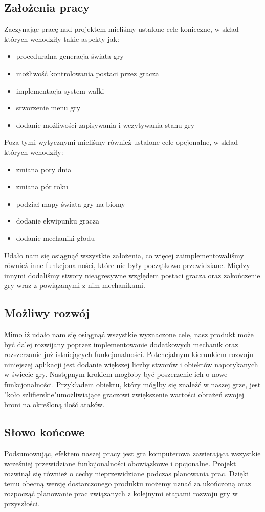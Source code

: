 \documentclass{article}
\begin{document}
\subsection{Założenia pracy}
Zaczynając pracę nad projektem mieliśmy ustalone cele konieczne, w skład których wchodziły takie aspekty jak:
\begin{itemize}
    \item proceduralna generacja świata gry
    \item możliwość kontrolowania postaci przez gracza
    \item implementacja system walki
    \item stworzenie menu gry
    \item dodanie możliwości zapisywania i wczytywania stanu gry
\end{itemize}
Poza tymi wytycznymi mieliśmy również ustalone cele opcjonalne, w skład których wchodziły:
\begin{itemize}
    \item zmiana pory dnia
    \item zmiana pór roku
    \item podział mapy świata gry na biomy
    \item dodanie ekwipunku gracza
    \item dodanie mechaniki głodu
\end{itemize}
Udało nam się osiągnąć wszystkie założenia, co więcej zaimplementowaliśmy również inne funkcjonalności, które nie były początkowo przewidziane. Między innymi dodaliśmy stwory nieagresywne względem postaci gracza oraz zakończenie gry wraz z powiązanymi z nim mechanikami.

\subsection{Możliwy rozwój}
Mimo iż udało nam się osiągnąć wszystkie wyznaczone cele, nasz produkt może być dalej rozwijany poprzez implementowanie dodatkowych mechanik oraz rozszerzanie już istniejących funkcjonalności. Potencjalnym kierunkiem rozwoju niniejszej aplikacji jest dodanie większej liczby stworów i obiektów napotykanych w świecie gry. Następnym krokiem mogłoby być poszerzenie ich o nowe funkcjonalności. Przykładem obiektu, który mógłby się znaleźć w naszej grze, jest "koło szlifierskie"\space umożliwiające graczowi zwiększenie wartości obrażeń swojej broni na określoną ilość ataków.

\subsection{Słowo końcowe}
Podsumowując, efektem naszej pracy jest gra komputerowa zawierająca wszystkie wcześniej przewidziane funkcjonalności obowiązkowe i opcjonalne. Projekt rozwinął się również o cechy nieprzewidziane podczas planowania prac. Dzięki temu obecną wersję dostarczonego produktu możemy uznać za ukończoną oraz rozpocząć planowanie prac związanych z kolejnymi etapami rozwoju gry w przyszłości.



\end{document}
